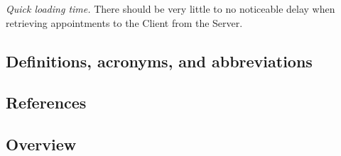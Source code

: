 \textit{Quick loading time.} There should be very little to no noticeable delay when retrieving appointments to the Client from the Server.


\subsection{Definitions, acronyms, and abbreviations}


\subsection{References}
\subsection{Overview}

